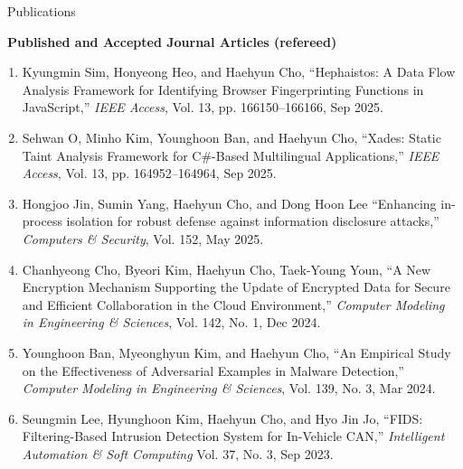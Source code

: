 \documentclass{resume} %
\begin{document}
\begin{rSection}{\faGenderless~Publications}
\begin{enumerate}[leftmargin=0pt]
	\end{enumerate}

	\vspace{3mm}
    \strut\textbullet~{\bf Published and Accepted Journal Articles (refereed)}
    \begin{enumerate}[leftmargin=0pt]
    	\item Kyungmin Sim, Honyeong Heo, and {Haehyun Cho},
    	``Hephaistos: A Data Flow Analysis Framework for Identifying Browser Fingerprinting Functions in JavaScript,''
    	\emph{IEEE Access},
    	Vol. 13, pp. 166150--166166, Sep 2025.

    	\item Sehwan O, Minho Kim, Younghoon Ban, and {Haehyun Cho},
    	``Xades: Static Taint Analysis Framework for C\#-Based Multilingual Applications,''
    	\emph{IEEE Access},
    	Vol. 13, pp. 164952--164964, Sep 2025.

    	\item Hongjoo Jin, Sumin Yang, {Haehyun Cho}, and Dong Hoon Lee
        ``Enhancing in-process isolation for robust defense against information disclosure attacks,''
        \emph{Computers \& Security},
        Vol. 152, May 2025.

    	\item Chanhyeong Cho, Byeori Kim, {Haehyun Cho}, Taek-Young Youn,
    	``A New Encryption Mechanism Supporting the Update of Encrypted Data for Secure and Efficient Collaboration in the Cloud Environment,''
        \emph{Computer Modeling in Engineering \& Sciences},
        Vol. 142, No. 1, Dec 2024.

    	\item Younghoon Ban, Myeonghyun Kim, and {Haehyun Cho},
    	``An Empirical Study on the Effectiveness of Adversarial Examples in Malware Detection,''
    	\emph{Computer Modeling in Engineering \& Sciences},
    	Vol. 139, No. 3, Mar 2024.

    	\item Seungmin Lee, Hyunghoon Kim, {Haehyun Cho}, and Hyo Jin Jo,
    	``FIDS: Filtering-Based Intrusion Detection System for In-Vehicle CAN,''
    	\emph{Intelligent Automation \& Soft Computing}
    	Vol. 37, No. 3, Sep 2023.


\end{enumerate}
\end{rSection}
\end{document}
